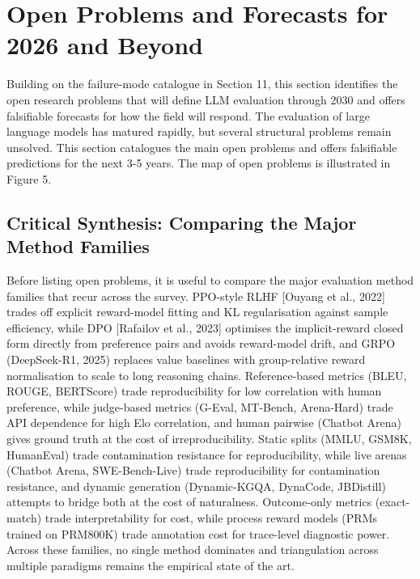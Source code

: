 \section{Open Problems and Forecasts for 2026 and Beyond}\label{open-problems-and-forecasts-for-2026-and-beyond}

Building on the failure-mode catalogue in Section 11, this section identifies the open research problems that will define LLM evaluation through 2030 and offers falsifiable forecasts for how the field will respond. The evaluation of large language models has matured rapidly, but several structural problems remain unsolved. This section catalogues the main open problems and offers falsifiable predictions for the next 3-5 years. The map of open problems is illustrated in Figure 5.

\subsection{Critical Synthesis: Comparing the Major Method Families}\label{critical-synthesis-comparing-the-major-method-families}

Before listing open problems, it is useful to compare the major evaluation method families that recur across the survey. PPO-style RLHF {[}Ouyang et al., 2022{]} trades off explicit reward-model fitting and KL regularisation against sample efficiency, while DPO {[}Rafailov et al., 2023{]} optimises the implicit-reward closed form directly from preference pairs and avoids reward-model drift, and GRPO (DeepSeek-R1, 2025) replaces value baselines with group-relative reward normalisation to scale to long reasoning chains. Reference-based metrics (BLEU, ROUGE, BERTScore) trade reproducibility for low correlation with human preference, while judge-based metrics (G-Eval, MT-Bench, Arena-Hard) trade API dependence for high Elo correlation, and human pairwise (Chatbot Arena) gives ground truth at the cost of irreproducibility. Static splits (MMLU, GSM8K, HumanEval) trade contamination resistance for reproducibility, while live arenas (Chatbot Arena, SWE-Bench-Live) trade reproducibility for contamination resistance, and dynamic generation (Dynamic-KGQA, DynaCode, JBDistill) attempts to bridge both at the cost of naturalness. Outcome-only metrics (exact-match) trade interpretability for cost, while process reward models (PRMs trained on PRM800K) trade annotation cost for trace-level diagnostic power. Across these families, no single method dominates and triangulation across multiple paradigms remains the empirical state of the art.

